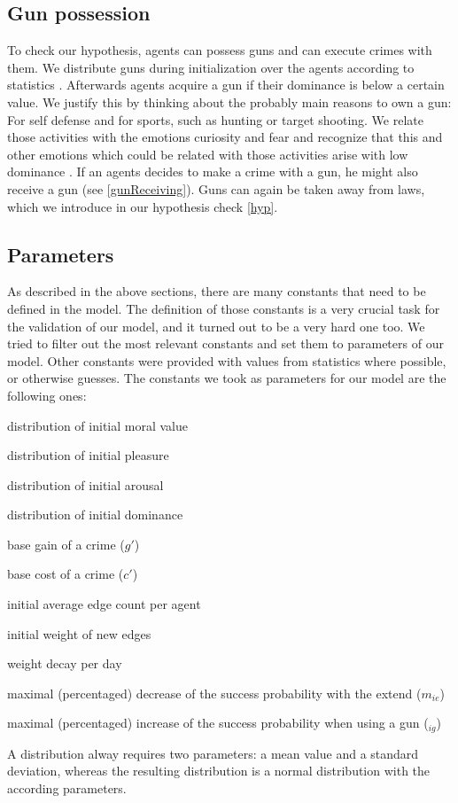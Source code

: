 \documentclass{JASSS}
\begin{document}
    \subsection{Gun possession}

    To check our hypothesis, agents can possess guns and can execute crimes with them.
    We distribute guns during initialization over the agents according to statistics \citep{gunpos}.
    Afterwards agents acquire a gun if their dominance is below a certain value.
    We justify this by thinking about the probably main reasons to own a gun: For self defense and for sports, such as hunting or target shooting. We relate those activities with the emotions curiosity and fear and recognize that this and other emotions which could be related with those activities arise with low dominance \citep{PAD_To_OCC}.
    If an agents decides to make a crime with a gun, he might also receive a gun (see \ref{gunReceiving}).
    Guns can again be taken away from laws, which we introduce in our hypothesis check \ref{hyp}.
    \label{gunPos}

    \subsection{Parameters}

    As described in the above sections, there are many constants that need to be defined in the model.
    The definition of those constants is a very crucial task for the validation of our model, and it turned out to be a very hard one too.
    We tried to filter out the most relevant constants and set them to parameters of our model.
    Other constants were provided with values from statistics where possible, or otherwise guesses.
    The constants we took as parameters for our model are the following ones:
    \begin{enumerate*}
        \item distribution of initial moral value
        \item distribution of initial pleasure
        \item distribution of initial arousal
        \item distribution of initial dominance
        \item base gain of a crime ($g'$)
        \item base cost of a crime ($c'$)
        \item initial average edge count per agent
        \item initial weight of new edges
        \item weight decay per day
        \item maximal (percentaged) decrease of the success probability with the extend ($m_{ie}$)
        \item maximal (percentaged) increase of the success probability when using a gun ($_{ig}$)
    \end{enumerate*}
    A distribution alway requires two parameters: a mean value and a standard deviation, whereas the resulting distribution is a normal distribution with the according parameters.
\end{document}
